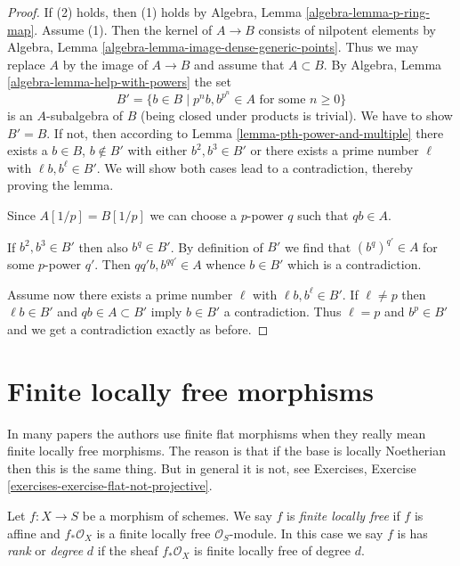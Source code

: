 \begin{proof}
If (2) holds, then (1) holds by Algebra, Lemma \ref{algebra-lemma-p-ring-map}.
Assume (1). Then the kernel of $A \to B$ consists of nilpotent
elements by Algebra, Lemma \ref{algebra-lemma-image-dense-generic-points}.
Thus we may replace $A$ by the image of $A \to B$ and assume that
$A \subset B$. By Algebra, Lemma \ref{algebra-lemma-help-with-powers}
the set
$$
B' = \{b \in B \mid p^nb, b^{p^n} \in A\text{ for some }n \geq 0\}
$$
is an $A$-subalgebra of $B$ (being closed under products is trivial).
We have to show $B' = B$. If not, then
according to Lemma \ref{lemma-pth-power-and-multiple}
there exists a $b \in B$, $b \not \in B'$ with either
$b^2, b^3 \in B'$ or there exists a prime number $\ell$
with $\ell b, b^\ell \in B'$.
We will show both cases lead to a contradiction, thereby proving the lemma.

\medskip\noindent
Since $A[1/p] = B[1/p]$ we can choose a $p$-power $q$ such that $qb \in A$.

\medskip\noindent
If $b^2, b^3 \in B'$ then also $b^q \in B'$. By definition of $B'$
we find that $(b^q)^{q'} \in A$ for some $p$-power $q'$.
Then $qq'b, b^{qq'} \in A$ whence $b \in B'$ which is a contradiction.

\medskip\noindent
Assume now there exists a prime number $\ell$ with $\ell b, b^\ell \in B'$.
If $\ell \not = p$ then $\ell b \in B'$ and $qb \in A \subset B'$ imply
$b \in B'$ a contradiction. Thus $\ell = p$ and $b^p \in B'$
and we get a contradiction exactly as before.
\end{proof}







\section{Finite locally free morphisms}
\label{section-finite-locally-free}

\noindent
In many papers the authors use finite flat morphisms when they really mean
finite locally free morphisms. The reason is that if the base is locally
Noetherian then this is the same thing. But in general it is not, see
Exercises, Exercise \ref{exercises-exercise-flat-not-projective}.

\begin{definition}
\label{definition-finite-locally-free}
Let $f : X \to S$ be a morphism of schemes.
We say $f$ is {\it finite locally free} if $f$ is
affine and $f_*\mathcal{O}_X$ is a finite locally
free $\mathcal{O}_S$-module. In this case we say $f$ is
has {\it rank} or {\it degree} $d$
if the sheaf $f_*\mathcal{O}_X$ is finite locally free of degree $d$.
\end{definition}

